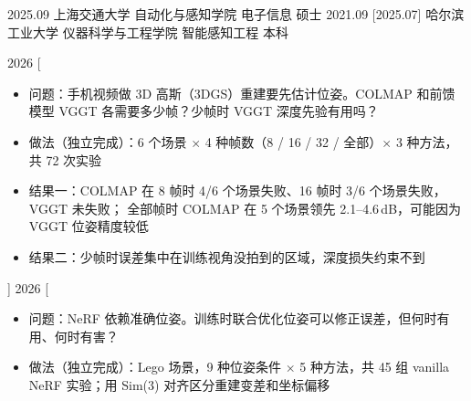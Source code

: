 \documentclass[zh]{resume}
\begin{document}
\makeheader

\begin{educations}
  \education%
    {2025.09}%
    {上海交通大学}%
    {自动化与感知学院}%
    {电子信息}%
    {硕士}
  \separator{0.5ex}
  \education%
    {2021.09}%
    [2025.07]%
    {哈尔滨工业大学}%
    {仪器科学与工程学院}%
    {智能感知工程}%
    {本科}
\end{educations}

\begin{experiences}
  \experience%
    {2026}%
    { \hfill
     \enspace
     }%
    [\begin{itemize}
      \item 问题：手机视频做 3D 高斯（3DGS）重建要先估计位姿。COLMAP 和前馈模型 VGGT 各需要多少帧？少帧时 VGGT 深度先验有用吗？
      \item 做法（独立完成）：6 个场景 $\times$ 4 种帧数（8 / 16 / 32 / 全部）$\times$ 3 种方法，共 72 次实验
      \item 结果一：COLMAP 在 8 帧时 4/6 个场景失败、16 帧时 3/6 个场景失败，VGGT 未失败；
        全部帧时 COLMAP 在 5 个场景领先 2.1--4.6\,dB，可能因为 VGGT 位姿精度较低
      \item 结果二：少帧时误差集中在训练视角没拍到的区域，深度损失约束不到
    \end{itemize}]
  \separator{0.5ex}
  \experience%
    {2026}%
    { \hfill
     \enspace
     }%
    [\begin{itemize}
      \item 问题：NeRF 依赖准确位姿。训练时联合优化位姿可以修正误差，但何时有用、何时有害？
      \item 做法（独立完成）：Lego 场景，9 种位姿条件 $\times$ 5 种方法，共 45 组 vanilla NeRF 实验；用 Sim(3) 对齐区分重建变差和坐标偏移

\end{itemize}
\end{experiences}
\end{document}
